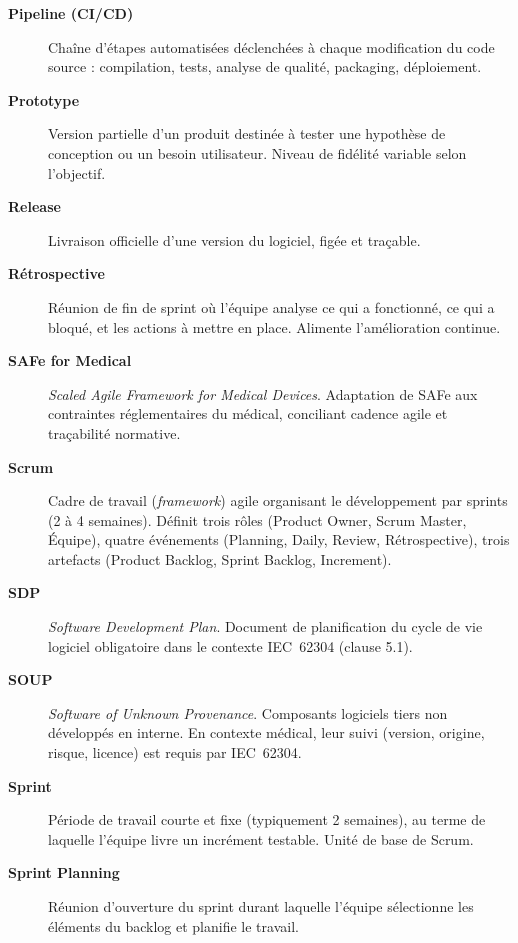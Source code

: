 \begin{description}
  \item[\textbf{Pipeline (CI/CD)}] Chaîne d'étapes automatisées déclenchées à chaque modification du code source : compilation, tests, analyse de qualité, packaging, déploiement.

  \item[\textbf{Prototype}] Version partielle d'un produit destinée à tester une hypothèse de conception ou un besoin utilisateur. Niveau de fidélité variable selon l'objectif.

  \item[\textbf{Release}] Livraison officielle d'une version du logiciel, figée et traçable.

  \item[\textbf{Rétrospective}] Réunion de fin de sprint où l'équipe analyse ce qui a fonctionné, ce qui a bloqué, et les actions à mettre en place. Alimente l'amélioration continue.

  \item[\textbf{SAFe for Medical}] \textit{Scaled Agile Framework for Medical Devices}. Adaptation de SAFe aux contraintes réglementaires du médical, conciliant cadence agile et traçabilité normative.

  \item[\textbf{Scrum}] Cadre de travail (\textit{framework}) agile organisant le développement par sprints (2 à 4 semaines). Définit trois rôles (Product Owner, Scrum Master, Équipe), quatre événements (Planning, Daily, Review, Rétrospective), trois artefacts (Product Backlog, Sprint Backlog, Increment).

  \item[\textbf{SDP}] \textit{Software Development Plan}. Document de planification du cycle de vie logiciel obligatoire dans le contexte IEC~62304 (clause 5.1).

  \item[\textbf{SOUP}] \textit{Software of Unknown Provenance}. Composants logiciels tiers non développés en interne. En contexte médical, leur suivi (version, origine, risque, licence) est requis par IEC~62304.

  \item[\textbf{Sprint}] Période de travail courte et fixe (typiquement 2 semaines), au terme de laquelle l'équipe livre un incrément testable. Unité de base de Scrum.

  \item[\textbf{Sprint Planning}] Réunion d'ouverture du sprint durant laquelle l'équipe sélectionne les éléments du backlog et planifie le travail.


\end{description}

